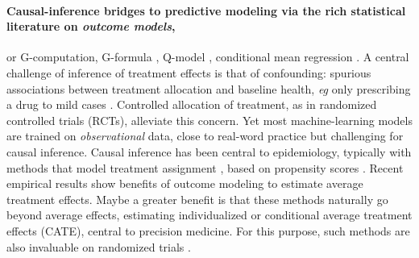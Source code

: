 \documentclass[french,12pt,twoside,a4paper]{book}
\begin{document}

\paragraph{Causal-inference bridges to predictive modeling via the rich statistical literature on \emph{outcome
    models},} or G-computation, G-formula \citep{robins_role_1986}, Q-model \citep{snowden_implementation_2011}, conditional
mean regression \citep{wendling_comparing_2018}. A central challenge of inference of treatment effects is that of
confounding: spurious associations between treatment allocation and baseline health, \emph{eg} only prescribing a drug
to mild cases \citep{hernan_causal_2020,vanderweele2019principles}. Controlled allocation of treatment, as in randomized
controlled trials (RCTs), alleviate this concern. Yet most machine-learning models are trained on \emph{observational}
data, close to real-word practice \citep{black1996we,hernan_methods_2021} but challenging for causal inference. Causal
inference has been central to epidemiology, typically with methods that model treatment assignment
\citep{austin_moving_2015,grose_use_2020}, based on propensity scores \citep{rosenbaum_central_1983}. Recent empirical
results \citep{wendling_comparing_2018,dorie_automated_2019} show benefits of outcome modeling to estimate average
treatment effects. Maybe a greater benefit is that these methods naturally go beyond average effects, estimating
individualized or conditional average treatment effects (CATE), central to precision medicine.
%
For this purpose, such methods are also invaluable on randomized trials
\citep{su2018random,lamont2018identification,hoogland2021tutorial}.
\end{document}
